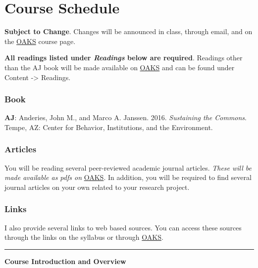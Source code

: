 \hypertarget{course-schedule}{%
\section{Course Schedule}\label{course-schedule}}

\textbf{Subject to Change}. Changes will be announced in class, through
email, and on the \href{https://lms.cofc.edu}{OAKS} course page.

\vspace{0.10in}

\noindent \textbf{All readings listed under \emph{Readings} below are
required}. Readings other than the AJ book will be made available on
\href{https://lms.cofc.edu}{OAKS} and can be found under Content
-\textgreater{} Readings.

\hypertarget{book}{%
\subsubsection{Book}\label{book}}

\textbf{AJ}: Anderies, John M., and Marco A. Janssen. 2016.
\emph{Sustaining the Commons}. Tempe, AZ: Center for Behavior,
Institutions, and the Environment.

\hypertarget{articles}{%
\subsubsection{Articles}\label{articles}}

You will be reading several peer-reviewed academic journal articles.
\emph{These will be made available as pdfs on}
\href{https://lms.cofc.edu}{OAKS}. In addition, you will be required to
find several journal articles on your own related to your research
project.

\hypertarget{links}{%
\subsubsection{Links}\label{links}}

I also provide several links to web based sources. You can access these
sources through the links on the syllabus or through
\href{https://lms.cofc.edu}{OAKS}.

\begin{center}\rule{0.5\linewidth}{0.5pt}\end{center}

\SetDate[16/08/2021]

\week \textbf{Course Introduction and Overview}

